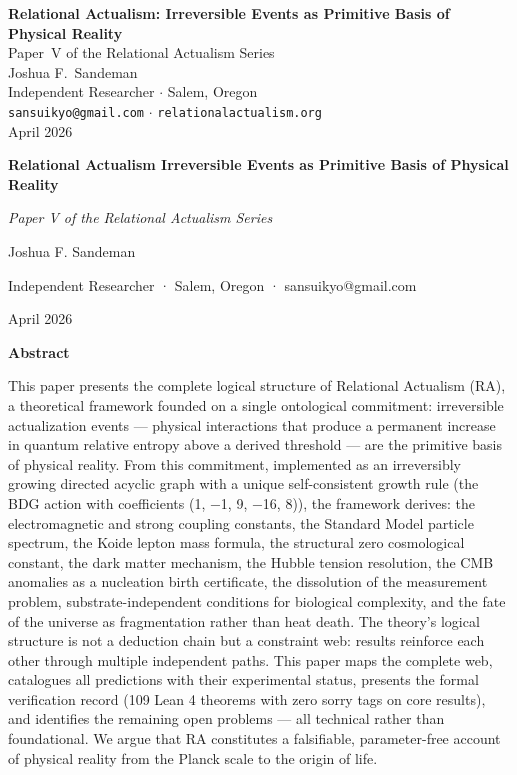 \documentclass[12pt,a4paper]{article}
\begin{document}
\begin{center}
{\LARGE\bfseries Relational Actualism: Irreversible Events as Primitive Basis of Physical Reality}\\[18pt]
{\large Paper~V of the Relational Actualism Series}\\[12pt]
{\large Joshua F.\ Sandeman}\\[4pt]
{\small Independent Researcher $\cdot$ Salem, Oregon}\\
{\small\texttt{sansuikyo@gmail.com} $\cdot$ \texttt{relationalactualism.org}}\\[6pt]
{\small April 2026}
\end{center}
\vspace{1em}

\textbf{Relational Actualism Irreversible Events as Primitive Basis of
Physical Reality}

\emph{Paper V of the Relational Actualism Series}

Joshua F. Sandeman

Independent Researcher · Salem, Oregon · sansuikyo@gmail.com

April 2026

\textbf{Abstract}

This paper presents the complete logical structure of Relational
Actualism (RA), a theoretical framework founded on a single ontological
commitment: irreversible actualization events --- physical interactions
that produce a permanent increase in quantum relative entropy above a
derived threshold --- are the primitive basis of physical reality. From
this commitment, implemented as an irreversibly growing directed acyclic
graph with a unique self-consistent growth rule (the BDG action with
coefficients (1, −1, 9, −16, 8)), the framework derives: the
electromagnetic and strong coupling constants, the Standard Model
particle spectrum, the Koide lepton mass formula, the structural zero
cosmological constant, the dark matter mechanism, the Hubble tension
resolution, the CMB anomalies as a nucleation birth certificate, the
dissolution of the measurement problem, substrate-independent conditions
for biological complexity, and the fate of the universe as fragmentation
rather than heat death. The theory's logical structure is not a
deduction chain but a constraint web: results reinforce each other
through multiple independent paths. This paper maps the complete web,
catalogues all predictions with their experimental status, presents the
formal verification record (109 Lean 4 theorems with zero sorry tags on
core results), and identifies the remaining open problems --- all
technical rather than foundational. We argue that RA constitutes a
falsifiable, parameter-free account of physical reality from the Planck
scale to the origin of life.
\end{document}
